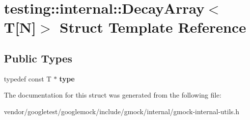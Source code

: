 \hypertarget{structtesting_1_1internal_1_1DecayArray_3_01T[N]_4}{}\section{testing\+:\+:internal\+:\+:Decay\+Array$<$ T\mbox{[}N\mbox{]}$>$ Struct Template Reference}
\label{structtesting_1_1internal_1_1DecayArray_3_01T[N]_4}
\subsection*{Public Types}
\begin{DoxyCompactItemize}
\item 
typedef const T $\ast$ {\bfseries type}\hypertarget{structtesting_1_1internal_1_1DecayArray_3_01T[N]_4_afc22a88da484b94639501c07fb90bfd3}{}\label{structtesting_1_1internal_1_1DecayArray_3_01T[N]_4_afc22a88da484b94639501c07fb90bfd3}

\end{DoxyCompactItemize}


The documentation for this struct was generated from the following file\+:\begin{DoxyCompactItemize}
\item 
vendor/googletest/googlemock/include/gmock/internal/gmock-\/internal-\/utils.\+h\end{DoxyCompactItemize}
